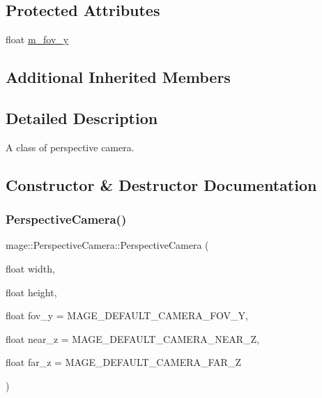 \subsection*{Protected Attributes}
\begin{DoxyCompactItemize}
\item 
float \hyperlink{classmage_1_1_perspective_camera_abdcf1a0cdd247e0f7e14e70898678af6}{m\+\_\+fov\+\_\+y}
\end{DoxyCompactItemize}
\subsection*{Additional Inherited Members}


\subsection{Detailed Description}
A class of perspective camera. 

\subsection{Constructor \& Destructor Documentation}
\hypertarget{classmage_1_1_perspective_camera_aef3998fca25cb7d99b9a03ef9483040d}{}\label{classmage_1_1_perspective_camera_aef3998fca25cb7d99b9a03ef9483040d} 
\subsubsection{\texorpdfstring{Perspective\+Camera()}{PerspectiveCamera()}\hspace{0.1cm}{\footnotesize\ttfamily [1/2]}}
{\footnotesize\ttfamily mage\+::\+Perspective\+Camera\+::\+Perspective\+Camera (\begin{DoxyParamCaption}\item[{float}]{width,  }\item[{float}]{height,  }\item[{float}]{fov\+\_\+y = {\ttfamily MAGE\+\_\+DEFAULT\+\_\+CAMERA\+\_\+FOV\+\_\+Y},  }\item[{float}]{near\+\_\+z = {\ttfamily MAGE\+\_\+DEFAULT\+\_\+CAMERA\+\_\+NEAR\+\_\+Z},  }\item[{float}]{far\+\_\+z = {\ttfamily MAGE\+\_\+DEFAULT\+\_\+CAMERA\+\_\+FAR\+\_\+Z} }\end{DoxyParamCaption})}

